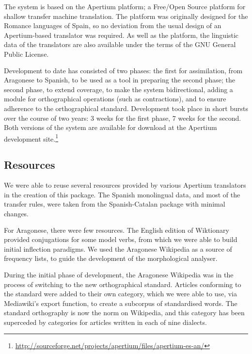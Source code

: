 \documentclass[10pt, a4paper]{article}
\begin{document}
  The system is based on the Apertium platform; a Free/Open Source platform for shallow transfer machine translation. The platform was originally designed for the Romance languages of Spain, so no deviation from the usual design of an Apertium-based translator was required. As well as the platform, the linguistic data of the translators are also available under the terms of the GNU General Public License.
  
  Development to date has consisted of two phases: the first for assimilation, from Aragonese to Spanish, to be used as a tool in preparing the second phase; the second phase, to extend coverage, to make the system bidirectional, adding a module for orthographical operations (such as contractions), and to ensure adherence to the orthographical standard. Development took place in short bursts over the course of two years: 3 weeks for the first phase, 7 weeks for the second. Both versions of the system are available for download at the Apertium development site.\footnote{\url{http://sourceforge.net/projects/apertium/files/apertium-es-an/}}

  \subsection{Resources}
  
  We were able to reuse several resources provided by various Apertium translators in the creation of this package. The Spanish monolingual data, and most of the transfer rules, were taken from the Spanish-Catalan package with minimal changes. 
  
  
  For Aragonese, there were few resources. The English edition of Wiktionary provided conjugations for some model verbs, from which we were able to build initial inflection paradigms. We used the Aragonese Wikipedia as a source of frequency lists, to guide the development of the morphological analyser.
  
  During the initial phase of development, the Aragonese Wikipedia was in the process of switching to the new orthographical standard. Articles conforming to the standard were added to their own category, which we were able to use, via Mediawiki's export function, to create a subcorpus of standardised words. The standard orthography is now the norm on Wikipedia, and this category has been superceded by categories for articles written in each of nine dialects.
  
\end{document}
